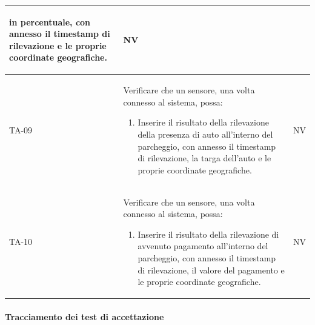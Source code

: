 \documentclass[8pt]{article}
\newcommand{\subsubsubsection}[1]{\paragraph{#1}\mbox{}\\\\}
\begin{document}
\begin{longtable}{|>{\centering}p{2cm}|>{\RaggedRight}m{12cm}|>{\centering\arraybackslash}p{2cm}|}
\begin{enumerate}
in percentuale, con annesso il timestamp di rilevazione e le proprie coordinate geografiche.
    \end{enumerate}
    & NV \\
    \hline
    TA-09 &
    Verificare che un sensore, una volta connesso al sistema, possa:
    \begin{enumerate}
    \item  Inserire il risultato della rilevazione della presenza di auto all’interno del
        parcheggio, con annesso il timestamp di rilevazione, la targa dell'auto e le proprie coordinate geografiche. 
    \end{enumerate}
    & NV \\
    \hline
    TA-10 &
    Verificare che un sensore, una volta connesso al sistema, possa:
    \begin{enumerate}
    \item Inserire il risultato della rilevazione di avvenuto pagamento all’interno del
        parcheggio, con annesso il timestamp di rilevazione, il valore del pagamento e le proprie coordinate geografiche. 
    \end{enumerate}
    & NV \\
    \hline
\end{longtable}
\subsubsubsection{Tracciamento dei test di accettazione}
\renewcommand{\arraystretch}{2.5}
\end{document}
